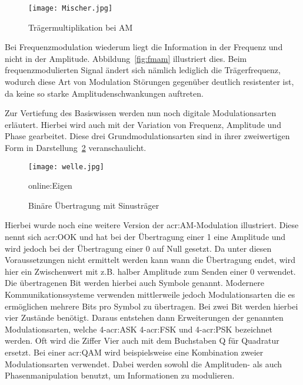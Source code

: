 \begin{figure}[H]
	\centering
	\texttt{[image: Mischer.jpg]}
	\caption[Trägermultiplikation bei AM]{Trägermultiplikation bei AM} 
	\cite{wernerNachrichtentechnikEinfuehrungFuer2010}
	\label{fig:mischer}
\end{figure}

Bei Frequenzmodulation wiederum liegt die Information in der Frequenz und nicht in der Amplitude. Abbildung~\ref{fig:fmam} illustriert dies. Beim frequenzmodulierten Signal ändert sich nämlich lediglich die Trägerfrequenz, wodurch diese Art von Modulation Störungen gegenüber deutlich resistenter ist, da keine so starke Amplitudenschwankungen auftreten.\cite{hoeher}


Zur Vertiefung des Basiswissen werden nun noch digitale Modulationsarten erläutert. Hierbei wird auch mit der Variation von Frequenz, Amplitude und Phase gearbeitet. Diese drei Grundmodulationsarten sind in ihrer zweiwertigen Form in Darstellung~\ref{fig:welle} veranschaulicht.

\begin{figure}[H]
	\centering
	\texttt{[image: welle.jpg]}
	\caption[Binäre Übertragung mit Sinusträger]{Binäre Übertragung mit Sinusträger} 
	\cite{wernerNachrichtentechnikEinfuehrungFuer2010}\gls{online:Eigen}
	\label{fig:welle}
\end{figure}

Hierbei wurde noch eine weitere Version der \gls{acr:AM}-Modulation illustriert. Diese nennt sich \gls{acr:OOK} und hat bei der Übertragung einer 1 eine Amplitude und wird jedoch bei der Übertragung einer 0 auf Null gesetzt. Da unter diesen Voraussetzungen nicht ermittelt werden kann wann die Übertragung endet, wird hier ein Zwischenwert mit z.B. halber Amplitude zum Senden einer 0 verwendet.
Die übertragenen Bit werden hierbei auch Symbole genannt. Modernere Kommunikationssysteme verwenden mittlerweile jedoch Modulationsarten die es ermöglichen mehrere Bits pro Symbol zu übertragen. Bei zwei Bit werden hierbei vier Zustände benötigt. Daraus entstehen dann Erweiterungen der genannten Modulationsarten, welche 4-\gls{acr:ASK} 4-\gls{acr:FSK} und 4-\gls{acr:PSK} bezeichnet werden. Oft wird die Ziffer Vier auch mit dem Buchstaben Q für Quadratur ersetzt.\cite{howwireless}\cite{butlerWirelessNetworkingDeveloping2013} Bei einer \gls{acr:QAM} wird beispielsweise eine Kombination zweier Modulationsarten verwendet. Dabei werden sowohl die Amplituden- als auch Phasenmanipulation benutzt, um Informationen zu modulieren. 

